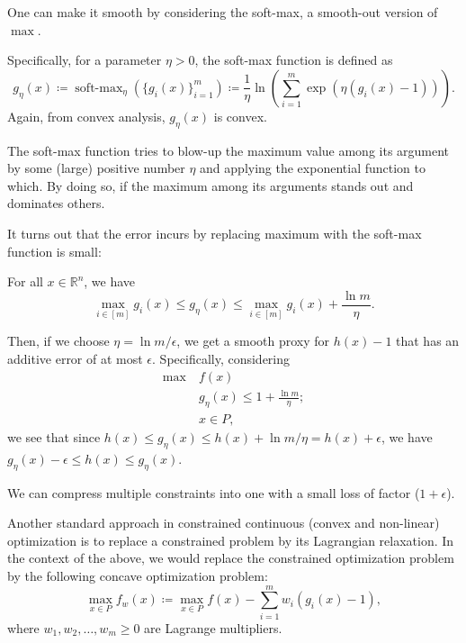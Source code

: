 \begin{intuition}
	One can make it smooth by considering the soft-max, a smooth-out version of \(\max\).
\end{intuition}

Specifically, for a parameter \(\eta > 0\), the soft-max function is defined as
\[
	g_\eta (x)
	\coloneqq \operatorname{soft-max}_\eta (\{ g_i (x)\}_{i=1}^{m} )
	\coloneqq \frac{1}{\eta } \ln ( \sum_{i=1}^{m} \exp (\eta (g_i(x) - 1 ) )).
\]
Again, from convex analysis, \(g_\eta (x)\) is convex.

\begin{intuition}
	The soft-max function tries to blow-up the maximum value among its argument by some (large) positive number \(\eta \) and applying the exponential function to which. By doing so, if the maximum among its arguments stands out and dominates others.
\end{intuition}

It turns out that the error incurs by replacing maximum with the soft-max function is small:

\begin{claim}
	For all \(x \in \mathbb{R} ^n\), we have
	\[
		\max _{i \in [m]} g_i(x)
		\leq g_\eta (x)
		\leq \max _{i \in [m]} g_i(x) + \frac{\ln m}{\eta }.
	\]
\end{claim}

Then, if we choose \(\eta = \ln m / \epsilon \), we get a smooth proxy for \(h(x) - 1\) that has an additive error of at most \(\epsilon \). Specifically, considering
\[
	\begin{aligned}
		\max~ & f(x)                                     \\
		      & g_\eta (x) \leq 1 + \frac{\ln m}{\eta }; \\
		      & x \in P,
	\end{aligned}
\]
we see that since \(h(x) \leq g_\eta (x) \leq h(x) + \ln m / \eta = h(x) + \epsilon \), we have \(g_\eta (x) - \epsilon \leq h(x) \leq g_\eta (x)\).

\begin{remark}
	We can compress multiple constraints into one with a small loss of factor (\(1 + \epsilon \)).
\end{remark}

Another standard approach in constrained continuous (convex and non-linear) optimization is to replace a constrained problem by its Lagrangian relaxation. In the context of the above, we would replace the constrained optimization problem by the following concave optimization problem:
\[
	\max_{x \in P} f_w(x) \coloneqq \max _{x \in P} f(x) - \sum_{i=1}^{m} w_i(g_i(x) - 1),
\]
where \(w_1, w_2, \dots , w_m \geq 0\) are Lagrange multipliers.

